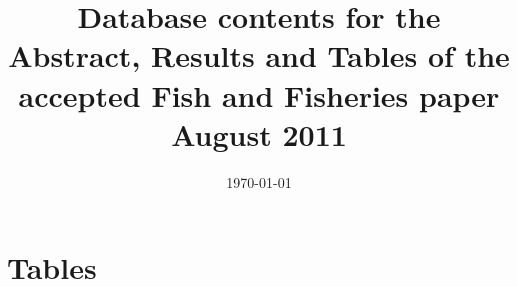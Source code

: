 \documentclass[letterpaper,review,authoryear,12pt]{myelsarticle}
\begin{document}
\begin{frontmatter}
\title{Database contents for the Abstract, Results and Tables of the accepted Fish and Fisheries paper August 2011}
\date{\today}
\end{frontmatter}




%
%

\section*{Tables}

\begin{small}

\end{small}
\end{document}
